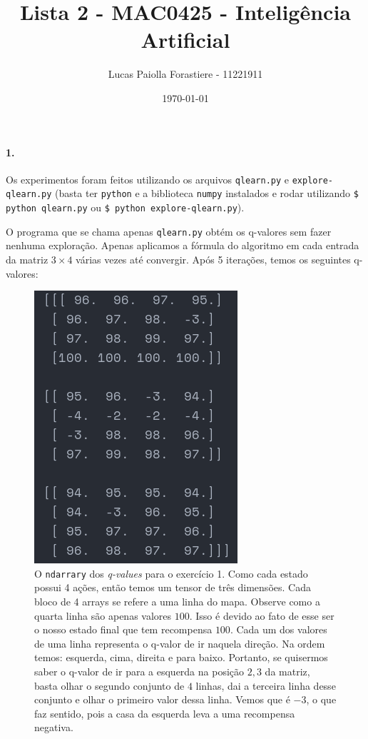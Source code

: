 \documentclass[12pt, a4paper, oneside]{article}
\title{Lista 2 - MAC0425 - Inteligência Artificial}
\date{\today}
\author{Lucas Paiolla Forastiere - 11221911}
\begin{document}
\maketitle

\paragraph{1.}%
\label{par:1_}

Os experimentos foram feitos utilizando os arquivos \texttt{qlearn.py} e
\texttt{explore-qlearn.py} (basta ter \texttt{python} e a biblioteca
\texttt{numpy} instalados e rodar utilizando \texttt{\$ python qlearn.py} ou
\texttt{\$ python explore-qlearn.py}).

O programa que se chama apenas \texttt{qlearn.py} obtém os q-valores sem fazer
nenhuma exploração. Apenas aplicamos a fórmula do algoritmo em cada entrada da
matriz $3\times 4$ várias vezes até convergir. Após 5 iterações, temos os
seguintes q-valores:

\begin{figure}[h]
\centering
\includegraphics[scale=0.8]{Res/q-values-ex1.png}
\caption{O \texttt{ndarrary} dos \textit{q-values} para o exercício 1. Como cada
estado possui 4 ações, então temos um tensor de três dimensões. Cada bloco de 4
arrays se refere a uma linha do mapa. Observe como a quarta linha são apenas
valores $100$. Isso é devido ao fato de esse ser o nosso estado final que tem
recompensa $100$.  Cada um dos valores de uma linha representa o q-valor de ir
naquela direção. Na ordem temos: esquerda, cima, direita e para baixo. Portanto,
se quisermos saber o q-valor de ir para a esquerda na posição $2,3$ da matriz,
basta olhar o segundo conjunto de $4$ linhas, dai a terceira linha desse
conjunto e olhar o primeiro valor dessa linha. Vemos que é $-3$, o que faz
sentido, pois a casa da esquerda leva a uma recompensa negativa.}
\label{q-values-ex1.png}
\end{figure}
\end{document}
